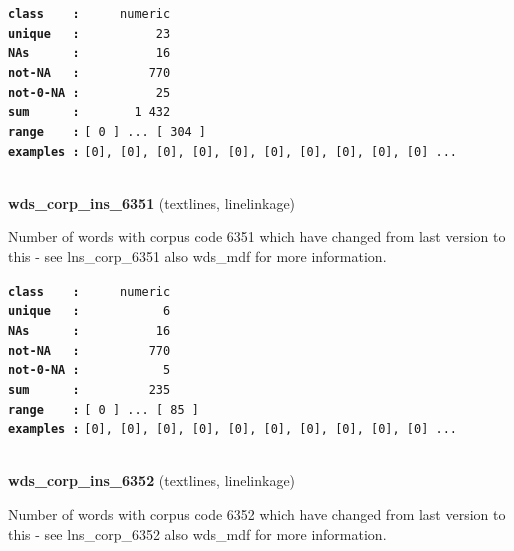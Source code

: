 \documentclass[]{article}
\begin{document}
\textbf{\texttt{class\ \ \ \ :}} \texttt{~~~~~numeric}\\
\textbf{\texttt{unique\ \ \ :}} \texttt{~~~~~~~~~~23}\\
\textbf{\texttt{NAs\ \ \ \ \ \ :}} \texttt{~~~~~~~~~~16}\\
\textbf{\texttt{not-NA\ \ \ :}} \texttt{~~~~~~~~~770}\\
\textbf{\texttt{not-0-NA\ :}} \texttt{~~~~~~~~~~25}\\
\textbf{\texttt{sum\ \ \ \ \ \ :}} \texttt{~~~~~~~1~432}\\
\textbf{\texttt{range\ \ \ \ :}}
\texttt{{[}\ 0\ {]}\ ...\ {[}\ 304\ {]}}\\
\textbf{\texttt{examples\ :}}
\texttt{{[}0{]},\ {[}0{]},\ {[}0{]},\ {[}0{]},\ {[}0{]},\ {[}0{]},\ {[}0{]},\ {[}0{]},\ {[}0{]},\ {[}0{]}\ ...}\\

~

\textbf{wds\_corp\_ins\_6351} (textlines, linelinkage)

Number of words with corpus code 6351 which have changed from last
version to this - see lns\_corp\_6351 also wds\_mdf for more
information.

\textbf{\texttt{class\ \ \ \ :}} \texttt{~~~~~numeric}\\
\textbf{\texttt{unique\ \ \ :}} \texttt{~~~~~~~~~~~6}\\
\textbf{\texttt{NAs\ \ \ \ \ \ :}} \texttt{~~~~~~~~~~16}\\
\textbf{\texttt{not-NA\ \ \ :}} \texttt{~~~~~~~~~770}\\
\textbf{\texttt{not-0-NA\ :}} \texttt{~~~~~~~~~~~5}\\
\textbf{\texttt{sum\ \ \ \ \ \ :}} \texttt{~~~~~~~~~235}\\
\textbf{\texttt{range\ \ \ \ :}}
\texttt{{[}\ 0\ {]}\ ...\ {[}\ 85\ {]}}\\
\textbf{\texttt{examples\ :}}
\texttt{{[}0{]},\ {[}0{]},\ {[}0{]},\ {[}0{]},\ {[}0{]},\ {[}0{]},\ {[}0{]},\ {[}0{]},\ {[}0{]},\ {[}0{]}\ ...}\\

~

\textbf{wds\_corp\_ins\_6352} (textlines, linelinkage)

Number of words with corpus code 6352 which have changed from last
version to this - see lns\_corp\_6352 also wds\_mdf for more
information.
\end{document}
